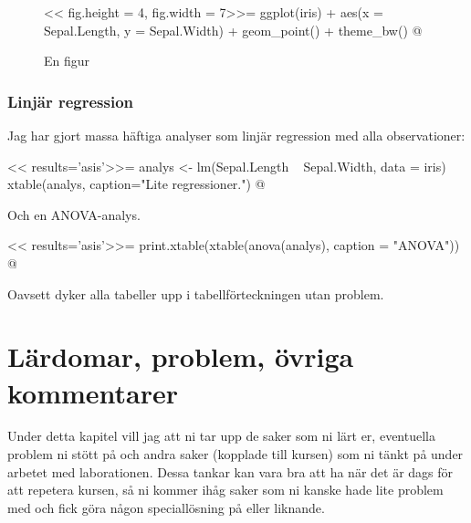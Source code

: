 \documentclass[10pt,swedish, openany]{book}
\begin{document}
\begin{figure}[H]
    \centering
    << fig.height = 4, fig.width = 7>>=
    ggplot(iris) + aes(x = Sepal.Length, y = Sepal.Width) + geom_point() +
  theme_bw()
    @
    \caption{En figur} %
    \label{fig:En-figur} %
\end{figure}

\subsection*{Linjär regression}
Jag har gjort massa häftiga analyser som linjär regression med alla  observationer:

<< results='asis'>>=
analys <- lm(Sepal.Length ~ Sepal.Width, data = iris)
xtable(analys, caption="Lite regressioner.")
@

Och en ANOVA-analys. 

<< results='asis'>>=
print.xtable(xtable(anova(analys), caption = "ANOVA"))
@

Oavsett dyker alla tabeller upp i tabellförteckningen utan problem.

\pagebreak

\chapter{Lärdomar, problem, övriga kommentarer}
Under detta kapitel vill jag att ni tar upp de saker som ni lärt er, eventuella problem ni stött på och andra saker (kopplade till kursen) som ni tänkt på under arbetet med laborationen. Dessa tankar kan vara bra att ha när det är dags för att repetera kursen, så ni kommer ihåg saker som ni kanske hade lite problem med och fick göra någon speciallösning på eller liknande.


\end{document}
